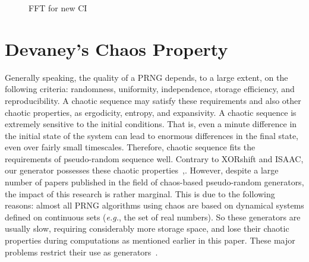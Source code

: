 \begin{figure}
 \hspace{0.5cm}
\caption{FFT for new CI}
\label{FFT for new CI}
\end{figure}

\section{Devaney's Chaos Property}

Generally speaking, the quality of a PRNG depends, to a large extent, on the following criteria: randomness, uniformity, independence, storage efficiency, and reproducibility. A chaotic sequence may satisfy these requirements and also other chaotic properties, as ergodicity, entropy, and expansivity. A chaotic sequence is extremely sensitive to the initial conditions. That is, even a minute difference in the initial state of the system can lead to enormous differences in the final state, even over fairly small timescales. Therefore, chaotic sequence fits the requirements of pseudo-random sequence well. Contrary to XORshift and ISAAC, our generator possesses these chaotic properties~\cite{guyeux09},\cite{wang2009}.
However, despite a large number of papers published in the field of chaos-based pseudo-random generators, the impact of this research is rather marginal. This is due to the following reasons: almost all PRNG algorithms using chaos are based on dynamical systems defined on continuous sets (\emph{e.g.}, the set of real numbers). So these generators are usually slow, requiring considerably more storage space, and lose their chaotic properties during computations as mentioned earlier in this paper. These major problems restrict their use as generators~\cite{Kocarev2001}.

